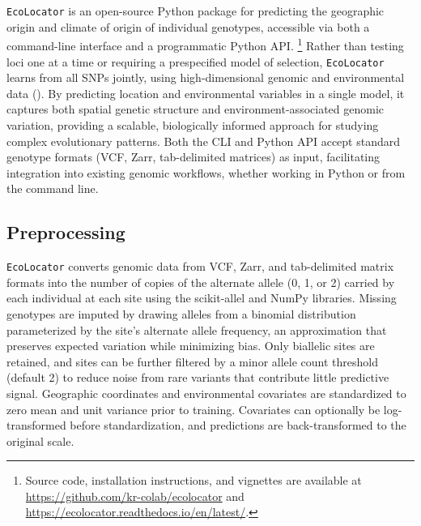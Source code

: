 \documentclass[]{article}
\newcommand{\ecolocator}{\texttt{EcoLocator}\xspace}
\begin{document}
\ecolocator is an open-source Python package
for predicting the geographic origin and climate of origin
of individual genotypes, accessible via both a command-line 
interface and a programmatic Python API.
\footnote{Source code, installation instructions, and vignettes are available at \url{https://github.com/kr-colab/ecolocator} and \url{https://ecolocator.readthedocs.io/en/latest/}.}
Rather than testing loci one at a time
or requiring a prespecified model of selection,
\ecolocator learns from all SNPs jointly,
using high-dimensional genomic and environmental data ().
By predicting location and environmental variables in a single model,
it captures both spatial genetic structure
and environment-associated genomic variation,
providing a scalable, biologically informed approach
for studying complex evolutionary patterns.
Both the CLI and Python API accept standard genotype formats 
(VCF, Zarr, tab-delimited matrices) as input,
facilitating integration into existing 
genomic workflows, whether working in Python or from the command line.


\subsection{Preprocessing}

\ecolocator converts genomic data from VCF, Zarr,
and tab-delimited matrix formats
into the number of copies of the alternate allele (0, 1, or 2)
carried by each individual at each site
using the scikit-allel \citep{scikit_allel_v1.3.8} and NumPy \citep{harris_array_2020} libraries.
Missing genotypes are imputed by drawing alleles
from a binomial distribution parameterized
by the site's alternate allele frequency,
an approximation that preserves expected variation
while minimizing bias.
Only biallelic sites are retained,
and sites can be further filtered by a minor allele count threshold
(default 2) to reduce noise from rare variants
that contribute little predictive signal.
Geographic coordinates and environmental covariates are standardized
to zero mean and unit variance prior to training.
Covariates can optionally be log-transformed before standardization,
and predictions are back-transformed to the original scale.
\end{document}
